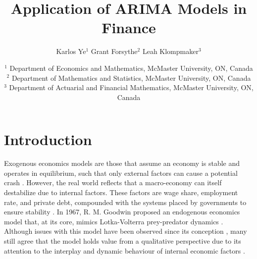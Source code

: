 \documentclass[12pt, centerh1]{article}
\title{Application of ARIMA Models in Finance} %
\author{\qquad Karlos Ye$^{1}$ \qquad Grant Forsythe$^{2}$ \qquad Leah Klompmaker$^{3}$}
\date{
{\footnotesize $^1$ Department of Economics and Mathematics, McMaster University, ON, Canada\\[-6pt]
               $^2$ Department of Mathematics and Statistics, McMaster University, ON, Canada\\[-6pt]
               $^3$ Department of Actuarial and Financial Mathematics, McMaster University, ON, Canada\\[-6pt]}
}
\begin{document}
\maketitle
\vspace{-8mm} %
\begin{abstract}

\end{abstract}
\newpage

\section{Introduction}
\noindent Exogenous economics models are those that assume an economy is stable and operates in equilibrium, such that only external factors can cause a potential crash \citep{ganti_2019}. However, the real world reflects that a macro-economy can itself destabilize due to internal factors. These factors are wage share, employment rate, and private debt, compounded with the systems placed by governments to ensure stability \citep{minsky1992financial}. In 1967, R. M. Goodwin proposed an endogenous economics model that, at its core, mimics Lotka-Volterra prey-predator dynamics \citep{goodwin1982growth}. Although issues with this model have been observed since its conception \citep{harvie2000testing}, many still agree that the model holds value from a qualitative perspective due to its attention to the interplay and dynamic behaviour of internal economic factors \citep{flaschel2016mathematical}. 
\end{document}
